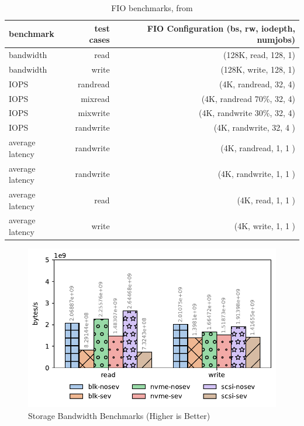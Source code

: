 \documentclass[twocolumn]{article}
\begin{document}
\begin{table}
    \centering
    \begin{tabular}{l|r|r}
        \hline
        \textbf{benchmark} & \textbf{test cases} & \textbf{FIO Configuration (bs, rw, iodepth, numjobs)} \\
        \hline
        bandwidth          &  read               & (128K, read, 128, 1)                                  \\
        bandwidth          & write               & (128K, write, 128, 1)                                 \\
        IOPS               &  randread           &(4K, randread, 32, 4)                                  \\
        IOPS               & mixread             & (4K, randread 70\%, 32, 4)                            \\
        IOPS               &  mixwrite           & (4K, randwrite 30\%, 32, 4)                           \\
        IOPS               &  randwrite          &  (4K, randwrite, 32, 4 )                              \\
        average latency    &  randwrite          & (4K, randread, 1, 1 )                                 \\
        average latency    &  randwrite          & (4K, randwrite, 1, 1 )                                \\
        average latency    &  read               &(4K, read, 1, 1 )                                      \\
        average latency    &  write	             & (4K, write, 1, 1 )                                    \\
    \end{tabular}
    \caption{FIO benchmarks, from \cite{spool}} 
    \label{tab:fio-benchmarks}
\end{table}

\begin{figure}
    \centering
    \includegraphics[width=\columnwidth]{img/bw.pdf}
    \caption{Storage Bandwidth Benchmarks (Higher is Better)}
    \label{fig:fio-bw}
\end{figure}
\end{document}
